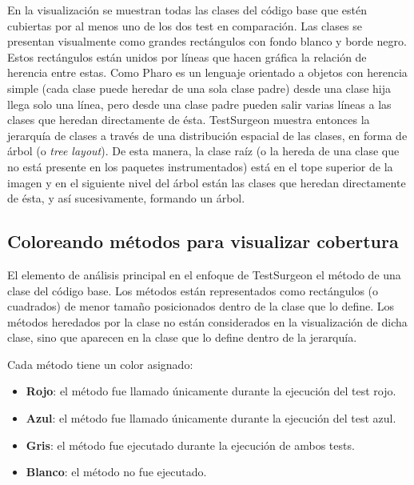 \par En la visualización se muestran todas las clases del código base que estén cubiertas por al menos uno de los dos test en comparación. Las clases se presentan visualmente como grandes rectángulos con fondo blanco y borde negro. Estos rectángulos están unidos por líneas que hacen gráfica la relación de herencia entre estas. Como Pharo es un lenguaje orientado a objetos con herencia simple (cada clase puede heredar de una sola clase padre) desde una clase hija llega solo una línea, pero desde una clase padre pueden salir varias líneas a las clases que heredan directamente de ésta. TestSurgeon muestra entonces la jerarquía de clases a través de una distribución espacial de las clases, en forma de árbol (o \emph{tree layout}). De esta manera, la clase raíz (o la hereda de una clase que no está presente en los paquetes instrumentados) está en el tope superior de la imagen y en el siguiente nivel del árbol están las clases que heredan directamente de ésta, y así sucesivamente, formando un árbol.


\subsection{Coloreando métodos para visualizar cobertura}

\par El elemento de análisis principal en el enfoque de TestSurgeon el método de una clase del código base. Los métodos están representados como rectángulos (o cuadrados) de menor tamaño posicionados dentro de la clase que lo define.  Los métodos heredados por la clase no están considerados en la visualización de dicha clase, sino que aparecen en la clase que lo define dentro de la jerarquía.  

\par Cada método tiene un color asignado:
\begin{itemize}
\item {\bf Rojo}: el método fue llamado únicamente durante la ejecución del test rojo.
\item {\bf Azul}: el método fue llamado únicamente durante la ejecución del test azul.
\item {\bf Gris}: el método fue ejecutado durante la ejecución de ambos tests.
\item {\bf Blanco}: el método no fue ejecutado.
\end{itemize}

